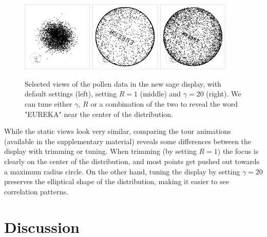 \documentclass[]{interact}
\theoremstyle{plain}%
\theoremstyle{definition}
\theoremstyle{remark}
\begin{document}
\begin{figure}
\centering
\includegraphics[width=0.3\textwidth]{../pngs/pollen_sage-088.png}
\includegraphics[width=0.3\textwidth]{../pngs/pollen_sage_R1-088.png}
\includegraphics[width=0.3\textwidth]{../pngs/pollen_sage_gam20-088.png}
\caption{Selected views of the pollen data in the new sage display, with default settings (left), setting $R=1$ (middle) and $\gamma=20$ (right). We can tune either $\gamma$, $R$ or a combination of the two to reveal the word "EUREKA" near the center of the distribution.}
\label{fig:pollen}
\end{figure}

While the static views look very similar, comparing the tour animations
(available in the supplementary material) reveals some differences
between the display with trimming or tuning. When trimming (by setting
\(R=1\)) the focus is clearly on the center of the distribution, and
most points get pushed out towards a maximum radius circle. On the other
hand, tuning the display by setting \(\gamma=20\) preserves the
elliptical shape of the distribution, making it easier to see
correlation patterns.

\hypertarget{sec:concl}{%
\section{Discussion}\label{sec:concl}}
\end{document}
